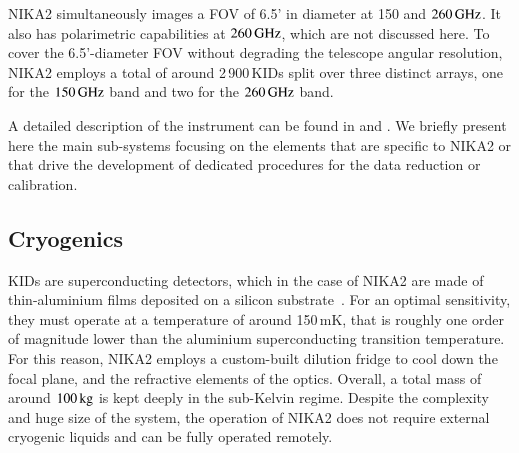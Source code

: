 
NIKA2 simultaneously images a FOV of
6.5' in diameter at 150 and $260\,\rm{GHz}$. It also has polarimetric
capabilities at  $260\,\rm{GHz}$, which are not discussed here. %
To cover the 6.5'-diameter FOV without degrading the
telescope angular resolution, NIKA2 employs a total of around
2\,900\,KIDs split over three distinct arrays, one for the $150\,\rm{GHz}$
band and two for the $260\,\rm{GHz}$ band.

A detailed description of the instrument can be found in
\citet{Adam2018} and \citet{Calvo2016JLTP}. We briefly present here the main sub-systems
focusing on the elements that are specific to NIKA2
or that drive the development of dedicated procedures for the data
reduction or calibration.


\subsection{Cryogenics}

{\lp KIDs are superconducting detectors, which in the case of NIKA2 are made of
thin-aluminium films deposited on a silicon substrate~\citep{Roesch2012_LEKID}.
For an optimal sensitivity, they must operate at a temperature of
around 150\,mK, that is roughly one order of magnitude lower than the
aluminium superconducting transition temperature.}  
For this reason,
NIKA2 employs a custom-built dilution fridge to cool down the focal plane, and the
refractive elements of the optics. Overall, a total mass of around
$100\, \rm{kg}$ is kept deeply in the sub-Kelvin regime. Despite the complexity
and huge size of the system, the operation of NIKA2 does not require
external cryogenic liquids and can be fully operated remotely.


